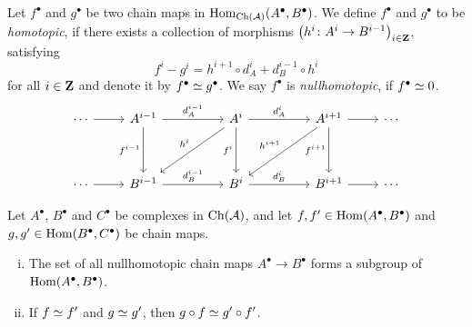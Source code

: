 \begin{definition}
    Let $f^\bullet$ and $g^\bullet$ be two chain maps in $\operatorname{Hom}_{\operatorname{Ch}(\mathcal A)}(A^\bullet, B^\bullet)$. We define $f^\bullet$ and $g^\bullet$ to be \emph{homotopic}, if there exists a collection of morphisms $\left( h^i\colon A^i \to B^{i-1} \right)_{i \in \mathbf Z}$, satisfying
    \[
        f^i - g^i = h^{i+1} \circ d^i_A + d^{i-1}_B \circ h^i
    \] 
    for all $i \in \mathbf Z$ and denote it by $f^\bullet \simeq g^\bullet$. We say $f^\bullet$ is \emph{nullhomotopic}, if $f^\bullet \simeq 0$.
    \[\begin{tikzcd}
        \cdots & {A^{i-1}} && {A^i} && {A^{i+1}} & \cdots \\
        \\
        \cdots & {B^{i-1}} && {B^i} && {B^{i+1}} & \cdots
        \arrow[from=1-1, to=1-2]
        \arrow["{d^{i-1}_A}", from=1-2, to=1-4]
        \arrow["{f^{i-1}}"', from=1-2, to=3-2]
        \arrow["{d^i_A}", from=1-4, to=1-6]
        \arrow["{h^i}"', from=1-4, to=3-2]
        \arrow["{f^i}"', from=1-4, to=3-4]
        \arrow[from=1-6, to=1-7]
        \arrow["{h^{i+1}}"', from=1-6, to=3-4]
        \arrow["{f^{i+1}}"', from=1-6, to=3-6]
        \arrow[from=3-1, to=3-2]
        \arrow["{d^{i-1}_B}", from=3-2, to=3-4]
        \arrow["{d^{i}_B}", from=3-4, to=3-6]
        \arrow[from=3-6, to=3-7]
        \end{tikzcd}\] 
\end{definition}

\begin{lemma}
    \label{nullhomotopics form a subgroup}
    Let $A^\bullet$, $B^\bullet$ and $C^\bullet$ be complexes in $\operatorname{Ch}(\mathcal A)$, and let $f, f' \in \operatorname{Hom}(A^\bullet, B^\bullet)$ and $g, g' \in \operatorname{Hom}(B^\bullet, C^\bullet)$ be chain maps.
    \begin{enumerate}[(i)]
        \item The set of all nullhomotopic chain maps $A^\bullet \to B^\bullet$ forms a subgroup of $\operatorname{Hom}(A^\bullet, B^\bullet)$.
        \item If $f \simeq f'$ and $g \simeq g'$, then $g \circ f \simeq g' \circ f'$.
    \end{enumerate}
\end{lemma}

